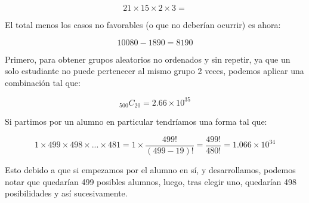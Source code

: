 \documentclass{article}
\begin{document}
$$21 \times 15 \times 2 \times 3 = $$

El total menos los casos no favorables (o que no deberían ocurrir) es ahora:

$$10080 - 1890 = 8190$$

\newpage


Primero, para obtener grupos aleatorios no ordenados y sin repetir, ya que un solo estudiante no puede pertenecer al mismo grupo 2 veces, podemos aplicar una combinación tal que:

$$_{500}C_{20} = 2.66 \times 10^{35}$$

Si partimos por un alumno en particular tendríamos una forma tal que:

$$1 \times 499 \times 498 \times ... \times 481 = 1 \times \dfrac{499!}{(499-19)!} = \dfrac{499!}{480!} = 1.066 \times 10^{34}$$

Esto debido a que si empezamos por el alumno en sí, y desarrollamos, podemos notar que quedarían 499 posibles alumnos, luego, tras elegir uno, quedarían 498 posibilidades y así sucesivamente.




\medskip
\end{document}
